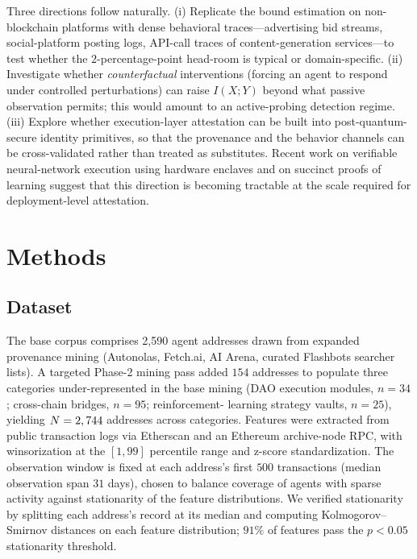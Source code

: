 \documentclass[11pt,a4paper]{article}
\begin{document}
Three directions follow naturally.
(i) Replicate the bound estimation on non-blockchain platforms with
dense behavioral traces---advertising bid streams, social-platform
posting logs, API-call traces of content-generation services---to test
whether the $2$-percentage-point head-room is typical or domain-specific.
(ii) Investigate whether \emph{counterfactual} interventions (forcing an
agent to respond under controlled perturbations) can raise $I(X;Y)$
beyond what passive observation permits; this would amount to an
active-probing detection regime.
(iii) Explore whether execution-layer attestation can be built into
post-quantum-secure identity primitives, so that the provenance and the
behavior channels can be cross-validated rather than treated as
substitutes. Recent work on verifiable neural-network execution using
hardware enclaves\cite{tramer2018,costan2016intelsgx} and on succinct
proofs of learning\cite{boneh2020zkp,sun2023attestedinference} suggest
that this direction is becoming tractable at the scale required for
deployment-level attestation.

\section*{Methods}

\subsection*{Dataset}

The base corpus comprises 2{,}590 agent addresses drawn from expanded
provenance mining (Autonolas, Fetch.ai, AI Arena, curated Flashbots
searcher lists). A targeted Phase-2 mining pass added $154$ addresses
to populate three categories under-represented in the base mining
(DAO execution modules, $n=34$; cross-chain bridges, $n=95$; reinforcement-
learning strategy vaults, $n=25$), yielding $N=2,744$ addresses across
\nClasses{} categories. Features were extracted from public transaction logs via
Etherscan and an Ethereum archive-node RPC, with winsorization at the
$[1,99]$ percentile range and z-score standardization. The observation
window is fixed at each address's first $500$ transactions (median
observation span $31$ days), chosen to balance coverage of agents with
sparse activity against stationarity of the feature distributions. We
verified stationarity by splitting each address's record at its median
and computing Kolmogorov--Smirnov distances on each feature distribution;
$91\%$ of features pass the $p < 0.05$ stationarity threshold.
\end{document}

